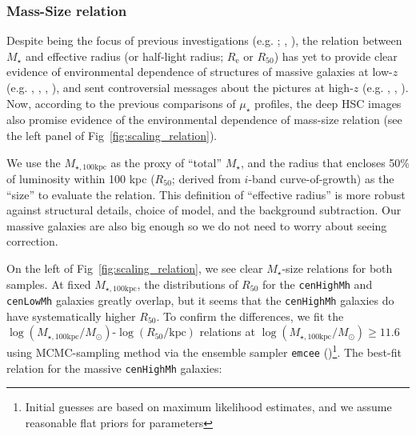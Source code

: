 \documentclass[a4paper,fleqn,usenatbib]{mnras}
\def\rbcg{\texttt{cenHighMh}}
\def\nbcg{\texttt{cenLowMh}}
\def\mstar{{$M_{\star}$}}
\def\mtot{{$M_{\star,100\mathrm{kpc}}$}}
\def\logmtot{{$\log (M_{\star,100\mathrm{kpc}}/M_{\odot})$}}
\def\mden{{$\mu_{\star}$}}
\begin{document}
\subsubsection{Mass-Size relation}
    \label{sssec:mass_size}
        
    Despite being the focus of previous investigations (e.g. \citealt{Shankar2013};
    \citealt{Leja2013}, \citealt{vdWel2014}), the relation between \mstar{} and 
    effective radius (or half-light radius; $R_{\mathrm{e}}$ or $R_{\mathrm{50}}$) 
    has yet to provide clear evidence of environmental dependence of structures of 
    massive galaxies at low-$z$ (e.g. \citealt{Weinmann2009}, \citealt{Nair2010}, 
    \citealt{HCompany13}, \citealt{Cerbrian2014}), and sent controversial messages 
    about the pictures at high-$z$ (e.g. \citealt{MCooper2012}, \citealt{Papovich2012}, 
    \citealt{Kelkar2015}).
    Now, according to the previous comparisons of \mden{} profiles, the deep HSC images 
    also promise evidence of the environmental dependence of mass-size relation 
    (see the left panel of Fig~\ref{fig:scaling_relation}).
     
    We use the \mtot{} as the proxy of ``total'' \mstar{}, and the radius that encloses 
    50\% of luminosity within 100 kpc ($R_{\mathrm{50}}$; derived from $i$-band 
    curve-of-growth) as the ``size'' to evaluate the relation.
    This definition of ``effective radius'' is more robust against structural details, 
    choice of model, and the background subtraction.   
    Our massive galaxies are also big enough so we do not need to worry about seeing
    correction.
    
    On the left of Fig~\ref{fig:scaling_relation}, we see clear \mstar{}-size relations 
    for both samples.  
    At fixed \mtot{}, the distributions of $R_{\mathrm{50}}$ for the \rbcg{} and
    \nbcg{} galaxies greatly overlap, but it seems that the \rbcg{} galaxies do have 
    systematically higher $R_{\mathrm{50}}$. 
    To confirm the differences, we fit the 
    \logmtot{}-$\log (R_{\mathrm{50}}/\mathrm{kpc})$ relations at 
    \logmtot{}$\geq 11.6$ using MCMC-sampling method via the ensemble sampler 
    \texttt{emcee} (\citealt{Emcee})\footnote{Initial guesses are based on maximum 
    likelihood estimates, and we assume reasonable flat priors for parameters}.
    The best-fit relation for the massive \rbcg{} galaxies:
    
\end{document}
